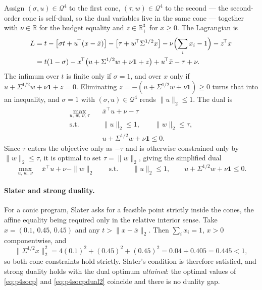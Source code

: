 \documentclass[11pt]{article}
\DeclareMathOperator*{\maximize}{max}
\newcommand{\R}{\mathbb{R}}
\newcommand{\T}{^{\!\top}}
\theoremstyle{definition}
\begin{document}
Assign $(\sigma,u) \in \mathcal{Q}^4$ to the first cone,
$(\tau,w) \in \mathcal{Q}^4$ to the second --- the second-order cone is
self-dual, so the dual variables live in the same cone --- together
with $\nu \in \R$ for the budget equality and $z \in \R^3_+$ for
$x \ge 0$. The Lagrangian is
\[
  \begin{aligned}
    L &= t - \bigl[\sigma t + u\T(x-\bar{x})\bigr]
          - \bigl[\tau + w\T \Sigma^{1/2} x\bigr]
          - \nu\Bigl(\sum_i x_i - 1\Bigr) - z\T x\\
      &= t(1-\sigma)
          - x\T\bigl(u + \Sigma^{1/2}w + \nu \mathbf{1} + z\bigr)
          + u\T\bar{x} - \tau + \nu .
  \end{aligned}
\]
The infimum over $t$ is finite only if $\sigma = 1$, and over $x$ only
if $u + \Sigma^{1/2}w + \nu\mathbf{1} + z = 0$. Eliminating
$z = -(u + \Sigma^{1/2}w + \nu\mathbf{1}) \ge 0$ turns that into an
inequality, and $\sigma = 1$ with $(\sigma,u) \in \mathcal{Q}^4$ reads
$\|u\|_2 \le 1$. The dual is
\begin{equation}\label{eq:p4socpdual}
\begin{aligned}
  \maximize_{u,\,w,\,\nu,\,\tau}\quad & \bar{x}\T u + \nu - \tau\\
  \text{s.t.}\quad & \|u\|_2 \le 1, \qquad \|w\|_2 \le \tau,\\
    & u + \Sigma^{1/2} w + \nu \mathbf{1} \le 0 .
\end{aligned}
\end{equation}
Since $\tau$ enters the objective only as $-\tau$ and is otherwise
constrained only by $\|w\|_2 \le \tau$, it is optimal to set
$\tau = \|w\|_2$, giving the simplified dual
\begin{equation}\label{eq:p4socpdual2}
  \maximize_{u,\,w,\,\nu}\quad
    \bar{x}\T u + \nu - \|w\|_2
  \qquad\text{s.t.}\qquad
    \|u\|_2 \le 1, \qquad
    u + \Sigma^{1/2} w + \nu \mathbf{1} \le 0 .
\end{equation}

\paragraph{Slater and strong duality.} For a conic program, Slater asks
for a feasible point strictly inside the cones, the affine equality
being required only in the relative interior sense. Take
$x = (0.1,\,0.45,\,0.45)$ and any $t > \|x-\bar{x}\|_2$. Then
$\sum_i x_i = 1$, $x > 0$ componentwise, and
\[
  \|\Sigma^{1/2}x\|_2^2 = 4(0.1)^2 + (0.45)^2 + (0.45)^2
  = 0.04 + 0.405 = 0.445 < 1 ,
\]
so both cone constraints hold strictly. Slater's condition is therefore
satisfied, and strong duality holds with the dual optimum
\emph{attained}: the optimal values of \eqref{eq:p4socp} and
\eqref{eq:p4socpdual2} coincide and there is no duality gap.
\end{document}
